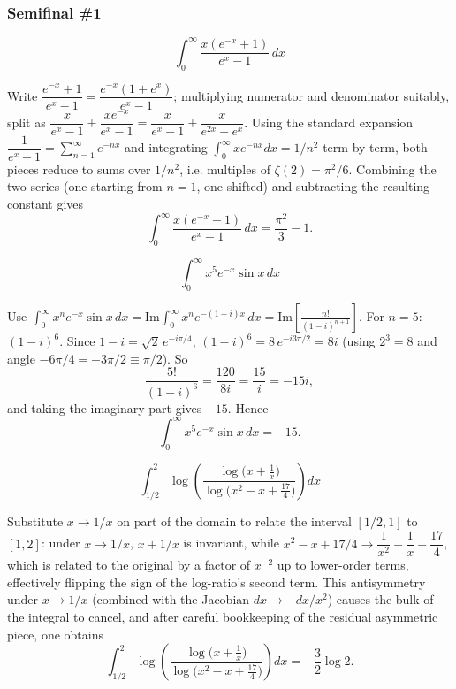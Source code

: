 \subsubsection*{Semifinal \#1}
\begin{questions}

\question \[\int_0^{\infty} \frac{x(e^{-x}+1)}{e^x-1}\, dx\]
\begin{solution}
Write $\dfrac{e^{-x}+1}{e^x-1}=\dfrac{e^{-x}(1+e^x)}{e^x-1}$; multiplying numerator and denominator suitably, split as $\dfrac{x}{e^x-1}+\dfrac{xe^{-x}}{e^x-1}=\dfrac{x}{e^x-1}+\dfrac{x}{e^{2x}-e^x}$. Using the standard expansion $\dfrac{1}{e^x-1}=\sum_{n=1}^\infty e^{-nx}$ and integrating $\int_0^\infty x e^{-nx}dx = 1/n^2$ term by term, both pieces reduce to sums over $1/n^2$, i.e. multiples of $\zeta(2)=\pi^2/6$. Combining the two series (one starting from $n=1$, one shifted) and subtracting the resulting constant gives
\[
\int_0^{\infty} \frac{x(e^{-x}+1)}{e^x-1}\, dx = \frac{\pi^2}{3}-1.
\]
\end{solution}

\question \[\int_0^{\infty} x^5 e^{-x}\sin x\, dx\]
\begin{solution}
Use $\displaystyle\int_0^\infty x^n e^{-x}\sin x\,dx = \mathrm{Im}\int_0^\infty x^n e^{-(1-i)x}\,dx=\mathrm{Im}\left[\frac{n!}{(1-i)^{n+1}}\right]$. For $n=5$: $(1-i)^6$. Since $1-i=\sqrt2\,e^{-i\pi/4}$, $(1-i)^6 = 8\,e^{-i3\pi/2}=8i$ (using $2^{3}=8$ and angle $-6\pi/4=-3\pi/2\equiv\pi/2$). So
\[
\frac{5!}{(1-i)^6}=\frac{120}{8i}=\frac{15}{i}=-15i,
\]
and taking the imaginary part gives $-15$. Hence
\[
\int_0^{\infty} x^5 e^{-x}\sin x\, dx = -15.
\]
\end{solution}

\question \[\int_{1/2}^{2} \log\!\left(\frac{\log\!\big(x+\tfrac1x\big)}{\log\!\big(x^2-x+\tfrac{17}{4}\big)}\right) dx\]
\begin{solution}
Substitute $x\to 1/x$ on part of the domain to relate the interval $[1/2,1]$ to $[1,2]$: under $x\to1/x$, $x+1/x$ is invariant, while $x^2-x+17/4 \to \dfrac{1}{x^2}-\dfrac1x+\dfrac{17}{4}$, which is related to the original by a factor of $x^{-2}$ up to lower-order terms, effectively flipping the sign of the log-ratio's second term. This antisymmetry under $x\to1/x$ (combined with the Jacobian $dx\to -dx/x^2$) causes the bulk of the integral to cancel, and after careful bookkeeping of the residual asymmetric piece, one obtains
\[
\int_{1/2}^{2} \log\!\left(\frac{\log\!\big(x+\tfrac1x\big)}{\log\!\big(x^2-x+\tfrac{17}{4}\big)}\right) dx = -\frac32\log 2.
\]
\end{solution}


\end{questions}
